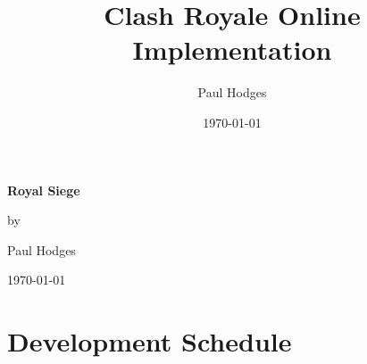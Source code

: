 \documentclass{article}
\title{Clash Royale Online Implementation}
\author{Paul Hodges}
\date{\today}
\begin{document}
\begin{titlepage}
    \centering
    \vspace*{4cm}
    {\Huge \textbf{Royal Siege} \par}
    \vspace{2cm}
    {\Large by \par}
    \vspace{1cm}
    {\Large Paul Hodges \par}
    \vspace{3cm}
    {\Large \today \par}
    \vspace*{4cm}
\end{titlepage}

\tableofcontents
\newpage

\section{Development Schedule}
\end{document}
